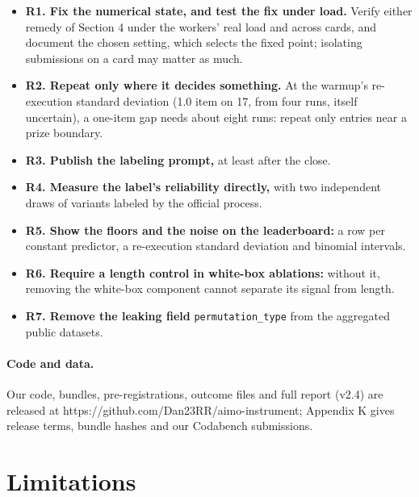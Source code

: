 \documentclass{article}
\begin{document}
\begin{itemize}
\item \textbf{R1. Fix the numerical state, and test the fix under load.} Verify either remedy of Section 4 under the workers' real load and across cards, and document the chosen setting, which selects the fixed point; isolating submissions on a card may matter as much.
\item \textbf{R2. Repeat only where it decides something.} At the warmup's re-execution standard deviation (1.0 item on 17, from four runs, itself uncertain), a one-item gap needs about eight runs: repeat only entries near a prize boundary.
\item \textbf{R3. Publish the labeling prompt,} at least after the close.
\item \textbf{R4. Measure the label's reliability directly,} with two independent draws of variants labeled by the official process.
\item \textbf{R5. Show the floors and the noise on the leaderboard:} a row per constant predictor, a re-execution standard deviation and binomial intervals.
\item \textbf{R6. Require a length control in white-box ablations:} without it, removing the white-box component cannot separate its signal from length.
\item \textbf{R7. Remove the leaking field} \texttt{permutation\_type} from the aggregated public datasets.
\end{itemize}

\paragraph{Code and data.}
Our code, bundles, pre-registrations, outcome files and full report (v2.4) are released at https://github.com/Dan23RR/aimo-instrument; Appendix K gives release terms, bundle hashes and our Codabench submissions.

\label{fine-testo}
\section*{Limitations}
\end{document}
